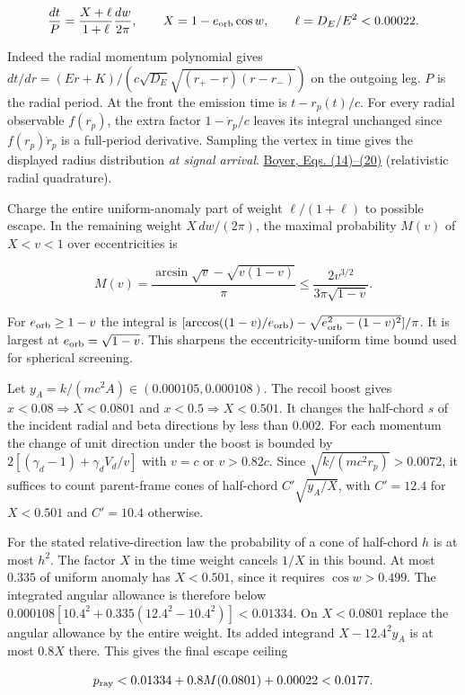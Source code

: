 \documentclass[11pt,a4paper]{article}
\begin{document}
\[
 \frac{dt}{P}=\frac{X+\ell}{1+\ell}\frac{dw}{2\pi},\qquad
 X=1-e_{\rm orb}\cos w,\qquad \ell=D_E/E^2<0.00022 .
\]

Indeed the radial momentum polynomial gives
\(dt/dr=(Er+K)/(c\sqrt{D_E}\sqrt{(r_+-r)(r-r_-)})\) on the outgoing leg.
\(P\) is the radial period. At the front the emission time is
\(t-r_p(t)/c\). For every radial observable \(f(r_p)\), the extra factor
\(1-\dot r_p/c\) leaves its integral unchanged since \(f(r_p)\dot r_p\)
is a full-period derivative. Sampling the vertex in time gives the
displayed radius distribution \emph{at signal arrival}.
\href{https://arxiv.org/pdf/physics/0405090}{Boyer, Eqs. (14)--(20)}
(relativistic radial quadrature).

Charge the entire uniform-anomaly part of weight \(\ell/(1+\ell)\) to
possible escape. In the remaining weight \(X\,dw/(2\pi)\), the maximal
probability \(M(v)\) of \(X<v<1\) over eccentricities is

\[
 M(v)=\frac{\arcsin\sqrt v-\sqrt{v(1-v)}}{\pi}
       \le\frac{2v^{3/2}}{3\pi\sqrt{1-v}} .
\]

For \(e_{\rm orb}\ge1-v\) the integral is
\([\arccos((1-v)/e_{\rm orb})-\sqrt{e_{\rm orb}^2-(1-v)^2}]/\pi\). It is
largest at \(e_{\rm orb}=\sqrt{1-v}\). This sharpens the
eccentricity-uniform time bound used for spherical screening.

Let \(y_A=k/(mc^2A)\in(0.000105,0.000108)\). The recoil boost gives
\(x<0.08\Rightarrow X<0.0801\) and \(x<0.5\Rightarrow X<0.501\). It
changes the half-chord \(s\) of the incident radial and beta directions
by less than \(0.002\). For each momentum the change of unit direction
under the boost is bounded by \(2[(\gamma_d-1)+\gamma_d V_d/v]\) with
\(v=c\) or \(v>0.82c\). Since \(\sqrt{k/(mc^2r_p)}>0.0072\), it suffices
to count parent-frame cones of half-chord \(C'\sqrt{y_A/X}\), with
\(C'=12.4\) for \(X<0.501\) and \(C'=10.4\) otherwise.

For the stated relative-direction law the probability of a cone of
half-chord \(h\) is at most \(h^2\). The factor \(X\) in the time weight
cancels \(1/X\) in this bound. At most \(0.335\) of uniform anomaly has
\(X<0.501\), since it requires \(\cos w>0.499\). The integrated angular
allowance is therefore below
\(0.000108[10.4^2+0.335(12.4^2-10.4^2)]<0.01334\). On \(X<0.0801\)
replace the angular allowance by the entire weight. Its added integrand
\(X-12.4^2y_A\) is at most \(0.8X\) there. This gives the final escape
ceiling

\[
 p_{\rm ray}<0.01334+0.8M(0.0801)+0.00022<0.0177 .
\]
\end{document}
